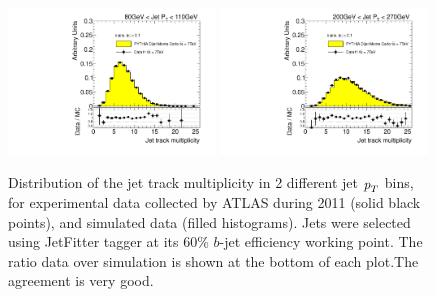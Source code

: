 \begin{figure}[tp]
\centering
\includegraphics[width=0.49\textwidth]{FIGS/dataMCJETFIT/FullDataVarNtrkPT080.pdf}
\includegraphics[width=0.49\textwidth]{FIGS/dataMCJETFIT/FullDataVarNtrkPT200.pdf}
\caption{ Distribution of the jet track multiplicity in 2 different jet ${\emph{p}_{T}}$ bins, for experimental data  collected by ATLAS during 2011 (solid black points), and simulated data (filled histograms). Jets were selected using JetFitter tagger at its 60\% $b$-jet efficiency working point. The ratio data over simulation is shown at the bottom of each plot.The agreement is very good.}
\label{fig:datamcinputvarsNTRKJETFIT}
\end{figure}
